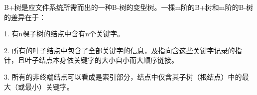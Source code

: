 {{B+树是应文件系统所需而出的一种B-树的变型树。}一棵m阶的B+树和m阶的B-树的差异在于：}

{1. 有n棵子树的结点中含有n个关键字。}

{2.
所有的叶子结点中包含了全部关键字的信息，及指向含这些关键字记录的指针，且叶子结点本身依关键字的大小自小而大顺序链接。}

{3.
所有的非终端结点可以看成是索引部分，{结点中仅含其子树（根结点）中的最大（或最小）关键字。}}
